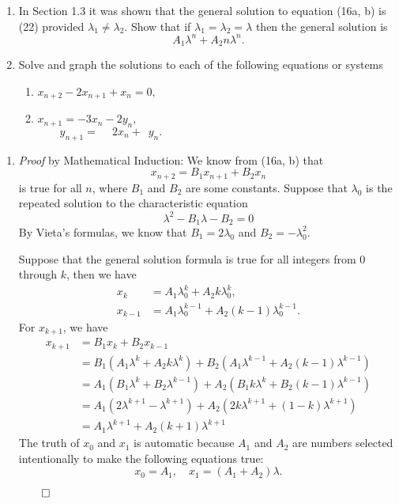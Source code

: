 \documentclass[
    classnum=MATH564,
    classname=MATHEMATICAL\ MODELING,
    due=January\ 28\,\ 2020,
    author=Gabrielle\ Streeter\qquad Hannah\ Wu\qquad\ Minghang\ Li,
    authorshort=Streeter\ \&\ Wu\ \&\ Li,
    teacher= Zachary\ M.\ Boyd,
    hw=1
]{hw-template}
\begin{document}
\begin{homeworkProblem}
\begin{enumerate}
    \item In Section 1.3 it was shown that the general solution to equation (16a, b) is
    (22) provided $\lambda_1 \neq \lambda_2$. Show that if
    $\lambda_1 = \lambda_2 = \lambda$ then the general solution is
    \[
        A_1\lambda^n + A_2 n \lambda^n.
    \]
    \item Solve and graph the solutions to each of the following equations or systems
    \begin{enumerate}[label=(\roman*)]
        \addtocounter{enumii}{1}
        \item $x_{n+2} - 2x_{n+1} + x_n = 0,$
        \item $x_{n+1} = -3 x_n - 2y_n,$\\
        $\qquad y_{n+1} = \phantom{-} 2 x_n +\phantom{2}y_n.$
    \end{enumerate}
\end{enumerate}

\segline

\solution
\begin{enumerate}
    \item \textit{Proof} by Mathematical Induction:
    We know from (16a, b) that
    \[
        x_{n+2} = B_1 x_{n+1} + B_2 x_{n}
    \]
    is true for all $n$, where $B_1$ and $B_2$ are some constants.
    Suppose that $\lambda_0$ is the repeated solution to the characteristic
    equation
    \[
        \lambda^2 - B_1 \lambda - B_2 = 0
    \]
    By Vieta's formulas, we know that $B_1 = 2\lambda_0$ and $B_2 = -\lambda_0^2$.

    Suppose that the general solution formula is true for all integers from $0$
    through $k$, then we have\[
    \begin{aligned}
        x_k &= A_1 \lambda_0^k + A_2 k \lambda_0^k,\\
        x_{k-1} &= A_1 \lambda_0^{k-1} + A_2 (k-1) \lambda_0^{k-1}.
    \end{aligned}
    \]
    For $x_{k+1}$, we have \[
        \begin{aligned}
            x_{k+1} &= B_1 x_{k} + B_2 x_{k-1}\\
            &= B_1 (A_1 \lambda^k + A_2 k \lambda^k) + B_2 (A_1 \lambda^{k-1} + A_2 (k-1) \lambda^{k-1})\\
            &= A_1 (B_1 \lambda^k + B_2 \lambda^{k-1}) + A_2 (B_1 k \lambda^k + B_2 (k-1) \lambda^{k-1})\\
            &= A_1 (2\lambda^{k+1} - \lambda^{k+1}) + A_2 (2k\lambda^{k+1} + (1-k) \lambda^{k+1})\\
            &= A_1 \lambda^{k+1} + A_2 (k+1) \lambda^{k+1}
        \end{aligned}
    \]
    The truth of $x_0$ and $x_1$ is automatic because $A_1$ and $A_2$ are numbers
    selected intentionally to make the following equations true: \[
        x_0 = A_1, \quad x_1 = (A_1 + A_2) \lambda.
    \]
    \begin{flushright}
        $\qed$
    \end{flushright}


\end{enumerate}
\end{homeworkProblem}
\end{document}
